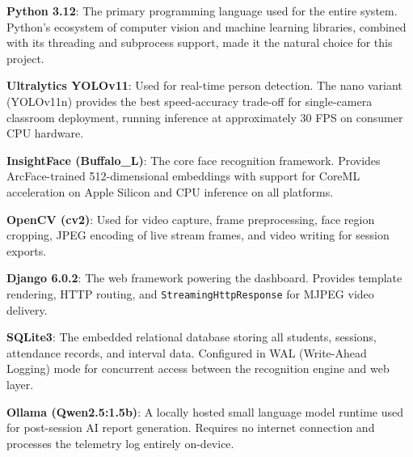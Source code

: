 \documentclass{report}
\begin{document}
\begin{itemize}
\normalsize{
    \item \textbf{Python 3.12}: The primary programming language used for the entire system. Python's\vspace{3pt} ecosystem of computer vision and machine learning libraries, combined with its threading and\vspace{3pt} subprocess support, made it the natural choice for this project.

    \item \textbf{Ultralytics YOLOv11}: Used for real-time person detection. The nano variant (YOLOv11n)\vspace{3pt} provides the best speed-accuracy trade-off for single-camera classroom deployment, running\vspace{3pt} inference at approximately 30 FPS on consumer CPU hardware.

    \item \textbf{InsightFace (Buffalo\_L)}: The core face recognition framework. Provides ArcFace-trained\vspace{3pt} 512-dimensional embeddings with support for CoreML acceleration on Apple Silicon and CPU\vspace{3pt} inference on all platforms.

    \item \textbf{OpenCV (cv2)}: Used for video capture, frame preprocessing, face region cropping,\vspace{3pt} JPEG encoding of live stream frames, and video writing for session exports.

    \item \textbf{Django 6.0.2}: The web framework powering the dashboard. Provides template rendering,\vspace{3pt} HTTP routing, and \texttt{StreamingHttpResponse} for MJPEG video delivery.

    \item \textbf{SQLite3}: The embedded relational database storing all students, sessions, attendance\vspace{3pt} records, and interval data. Configured in WAL (Write-Ahead Logging) mode for concurrent\vspace{3pt} access between the recognition engine and web layer.

    \item \textbf{Ollama (Qwen2.5:1.5b)}: A locally hosted small language model runtime used for\vspace{3pt} post-session AI report generation. Requires no internet connection and processes the\vspace{3pt} telemetry log entirely on-device.

}
\end{itemize}
\end{document}
